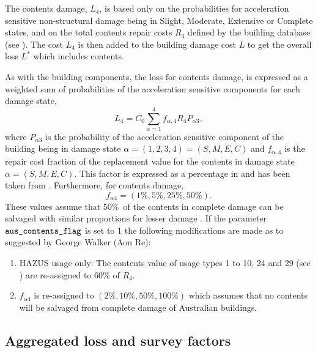 The contents damage, $L_4$, is based only on the probabilities for
acceleration sensitive non-structural damage being in Slight,
Moderate, Extensive or Complete states, and on the total contents
repair costs $R_4$ defined by the building database (see ). The cost $L_4$
is then added to the building damage cost $L$ to get the overall
loss $L^*$ which includes contents.

As with the building components, the loss for contents damage, is
expressed as a weighted sum of probabilities of the acceleration
sensitive components for each damage state,
\begin{equation}
\label{eq:vlosses-contents}
 L_{4} = C_0 \sum_{\alpha=1}^{4} f_{\alpha,4}R_4P_{\alpha 3},
\end{equation}
where $P_{\alpha 3}$ is the probability of the acceleration
sensitive component of the building being in damage state
$\alpha=(1,2,3,4)=(S,M,E,C)$ and $f_{\alpha,4}$ is the repair cost
fraction of the replacement value for the contents in damage state
$\alpha=(S,M,E,C)$. This factor is expressed as a percentage in
 and has been taken from \citet[Table
15.6, page 15-21]{dr_FEMA99b}. Furthermore, for contents damage,
\begin{equation}
 f_{\alpha 4} = (1\%, 5\%, 25\%, 50\%).
\end{equation}
These values assume that 50\%\ of the contents in complete damage
can be salvaged with similar proportions for lesser damage
\citep{dr_FEMA99b}. If the  parameter
$\typepar{aus}{\_contents}{\_flag}$ is set to 1 the following
modifications are made as to suggested by George Walker (Aon Re):
\begin{enumerate}
\item HAZUS usage only: The contents
value of usage types 1 to 10, 24 and 29 (see
) are re-assigned to 60\% of $R_4$.
\item $f_{\alpha 4}$ is re-assigned to $(2\%, 10\%, 50\%, 100\%)$
which assumes that no contents will be salvaged from complete
damage of Australian buildings.
\end{enumerate}

\subsection{Aggregated loss and survey factors}
\label{sec:loss-surveyfacts}

